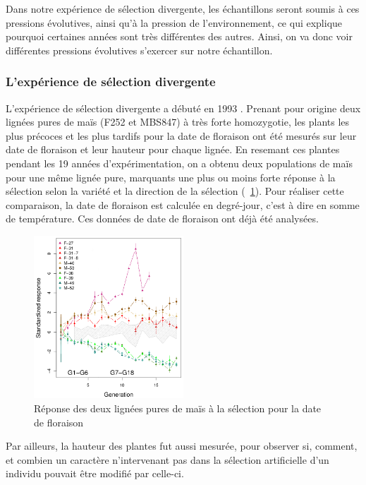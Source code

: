 \documentclass[12pt,a4paper]{article}
\begin{document}
							Dans notre expérience de sélection divergente, les échantillons seront soumis à ces pressions évolutives, ainsi qu'à la pression de l'environnement, ce qui explique pourquoi certaines années sont très différentes des autres. Ainsi, on va donc voir différentes pressions évolutives s'exercer sur notre échantillon.
							
					
					\subsubsection{L'expérience de sélection divergente}
					
						L'expérience de sélection divergente a débuté en 1993 \cite{basso_divergent_2008,durand_standing_2010,thomas_biologie_2010}. Prenant pour origine deux lignées pures de maïs (F252 et MBS847) à très forte homozygotie, les plants les plus précoces et les plus tardifs pour la date de floraison ont été mesurés sur leur date de floraison et leur hauteur pour chaque lignée. En resemant ces plantes pendant les 19 années d'expérimentation, on a obtenu deux populations de maïs pour une même lignée pure, marquants une plus ou moins forte réponse à la sélection selon la variété et la direction de la sélection (~\ref{sélection}). Pour réaliser cette comparaison, la date de floraison est calculée en degré-jour, c'est à dire en somme de température. Ces données de date de floraison ont déjà été analysées.
						\begin{figure}
							\centering
							\includegraphics[width =0.5\textwidth]{selection.png}
							\caption{Réponse des deux lignées pures de maïs à la sélection pour la date de floraison}
							\label{sélection}
						\end{figure}
						
						Par ailleurs, la hauteur des plantes fut aussi mesurée, pour observer si, comment, et combien un caractère n'intervenant pas dans la sélection artificielle d'un individu pouvait être modifié par celle-ci.
					
\end{document}

